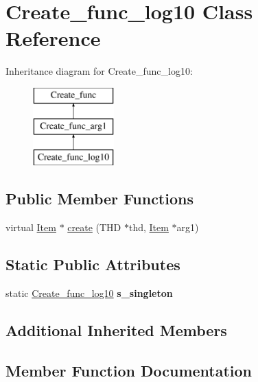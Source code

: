 \hypertarget{classCreate__func__log10}{}\section{Create\+\_\+func\+\_\+log10 Class Reference}
\label{classCreate__func__log10}
Inheritance diagram for Create\+\_\+func\+\_\+log10\+:\begin{figure}[H]
\begin{center}
\leavevmode
\includegraphics[height=3.000000cm]{classCreate__func__log10}
\end{center}
\end{figure}
\subsection*{Public Member Functions}
\begin{DoxyCompactItemize}
\item 
virtual \mbox{\hyperlink{classItem}{Item}} $\ast$ \mbox{\hyperlink{classCreate__func__log10_aa4d0c1152c45c22baa5fb9cadadf87bd}{create}} (T\+HD $\ast$thd, \mbox{\hyperlink{classItem}{Item}} $\ast$arg1)
\end{DoxyCompactItemize}
\subsection*{Static Public Attributes}
\begin{DoxyCompactItemize}
\item 
\mbox{\label{classCreate__func__log10_a32f7ee9fb54c6e6b00904ffd2e659078}} 
static \mbox{\hyperlink{classCreate__func__log10}{Create\+\_\+func\+\_\+log10}} {\bfseries s\+\_\+singleton}
\end{DoxyCompactItemize}
\subsection*{Additional Inherited Members}


\subsection{Member Function Documentation}
\mbox{\label{classCreate__func__log10_aa4d0c1152c45c22baa5fb9cadadf87bd}} 
